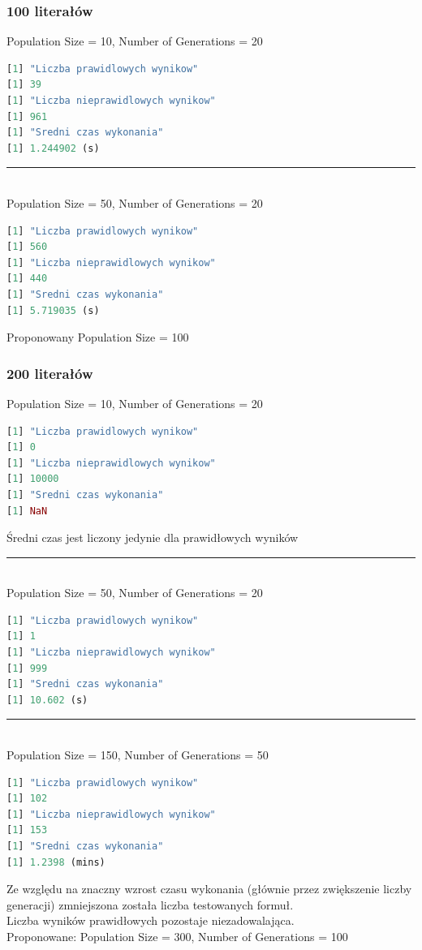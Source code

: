 \documentclass[11pt]{article}
\theoremstyle{note}
\begin{document}
\subsubsection{100 literałów}
Population Size = 10, Number of Generations = 20
\begin{lstlisting}[language=R]
[1] "Liczba prawidlowych wynikow"
[1] 39
[1] "Liczba nieprawidlowych wynikow"
[1] 961
[1] "Sredni czas wykonania"
[1] 1.244902 (s)
\end{lstlisting}
\noindent\rule{13cm}{0.4pt}\\
Population Size = 50, Number of Generations = 20
\begin{lstlisting}[language=R]
[1] "Liczba prawidlowych wynikow"
[1] 560
[1] "Liczba nieprawidlowych wynikow"
[1] 440
[1] "Sredni czas wykonania"
[1] 5.719035 (s)
\end{lstlisting}
Proponowany Population Size = 100

\subsubsection{200 literałów}
Population Size = 10, Number of Generations = 20
\begin{lstlisting}[language=R]
[1] "Liczba prawidlowych wynikow"
[1] 0
[1] "Liczba nieprawidlowych wynikow"
[1] 10000
[1] "Sredni czas wykonania"
[1] NaN
\end{lstlisting}
Średni czas jest liczony jedynie dla prawidłowych wyników\\
\noindent\rule{13cm}{0.4pt}\\
Population Size = 50, Number of Generations = 20
\begin{lstlisting}[language=R]
[1] "Liczba prawidlowych wynikow"
[1] 1
[1] "Liczba nieprawidlowych wynikow"
[1] 999
[1] "Sredni czas wykonania"
[1] 10.602 (s)
\end{lstlisting}
\noindent\rule{13cm}{0.4pt}\\
Population Size = 150, Number of Generations = 50
\begin{lstlisting}[language=R]
[1] "Liczba prawidlowych wynikow"
[1] 102
[1] "Liczba nieprawidlowych wynikow"
[1] 153
[1] "Sredni czas wykonania"
[1] 1.2398 (mins)
\end{lstlisting}
Ze względu na znaczny wzrost czasu wykonania (głównie przez zwiększenie liczby generacji) zmniejszona została liczba testowanych formuł. \\ Liczba wyników prawidłowych pozostaje niezadowalająca. \\
Proponowane: Population Size = 300, Number of Generations = 100
\end{document}
